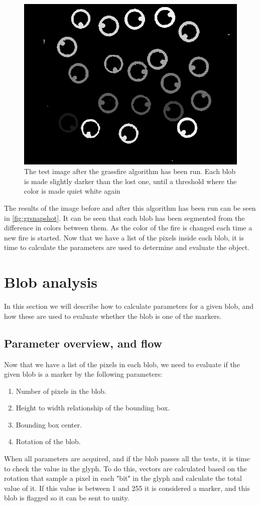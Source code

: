 \begin{figure}[H]
	\centering
	\includegraphics[width=0.6\linewidth]{figure/Analysis/grassfire.png}
	\caption{The test image after the grassfire algorithm has been run. Each blob is made slightly darker than the lost one, until a threshold where the color is made quiet white again}
	\label{fig:grsnapshot}
\end{figure} 
The results of the image before and after this algorithm has been run can be seen in \autoref{fig:grsnapshot}. It can be seen that each blob has been segmented from the difference in colors between them. As the color of the fire is changed each time a new fire is started. Now that we have a list of the pixels inside each blob, it is time to calculate the parameters are used to determine and evaluate the object.
\section{Blob analysis}
In this section we will describe how to calculate parameters for a given blob, and how these are used to evaluate whether the blob is one of the markers.
\subsection{Parameter overview, and flow}
Now that we have a list of the pixels in each blob, we need to evaluate if the given blob is a marker by the following parameters:
\begin{enumerate}
	\item Number of pixels in the blob.
	\item Height to width relationship of the bounding box.
	\item Bounding box center.
	\item Rotation of the blob.
\end{enumerate}
When all parameters are acquired, and if the blob passes all the tests, it is time to check the value in the glyph. To do this, vectors are calculated based on the rotation that sample a pixel in each "bit" in the glyph and calculate the total value of it. If this value is between 1 and 255 it is considered a marker, and this blob is flagged so it can be sent to unity.\\


